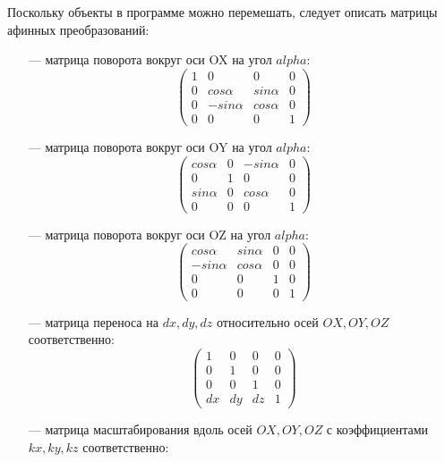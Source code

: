 \documentclass[a4paper, 14pt]{extreport}
\begin{document}
Поскольку объекты в программе можно перемешать, следует описать матрицы афинных преобразований:
\begin{itemize}
	\item[---] матрица поворота вокруг оси OX на угол $alpha$:
		\begin{equation}
			\begin{pmatrix}
				1 	& 0 		  & 0 	       & 0 \\
				0 	& cos \alpha  & sin \alpha & 0 \\
				0	& -sin \alpha & cos \alpha & 0 \\
				0 	& 0 		  & 0          & 1
			\end{pmatrix}
		\end{equation}
	\item[---] матрица поворота вокруг оси OY на угол $alpha$:
		\begin{equation}
			\begin{pmatrix}
				cos \alpha 	& 0 & -sin \alpha & 0 \\
				0 			& 1 & 0 		  & 0 \\
				sin \alpha	& 0 & cos \alpha  & 0 \\
				0 			& 0 & 0           & 1
			\end{pmatrix}
		\end{equation}
	\item[---] матрица поворота вокруг оси OZ на угол $alpha$:
		\begin{equation}
			\begin{pmatrix}
				cos \alpha 	 & sin \alpha & 0 & 0 \\
				-sin \alpha  & cos \alpha & 0 & 0 \\
				0	 		 & 0		  & 1 & 0 \\
				0 			 & 0 		  & 0 & 1
			\end{pmatrix}
		\end{equation}
	\item[---] матрица переноса на $dx, dy, dz$ относительно осей $OX, OY, OZ$ соответственно:
		\begin{equation}
			\begin{pmatrix}
				1   & 0   & 0   & 0 \\
				0   & 1   & 0   & 0 \\
				0   & 0   & 1   & 0 \\
				dx & dy & dz & 1
			\end{pmatrix}
		\end{equation}
	\item[---] матрица масштабирования вдоль осей $OX, OY, OZ$ с коэффициентами $kx, ky, kz$ соответственно:

\end{itemize}
\end{document}
